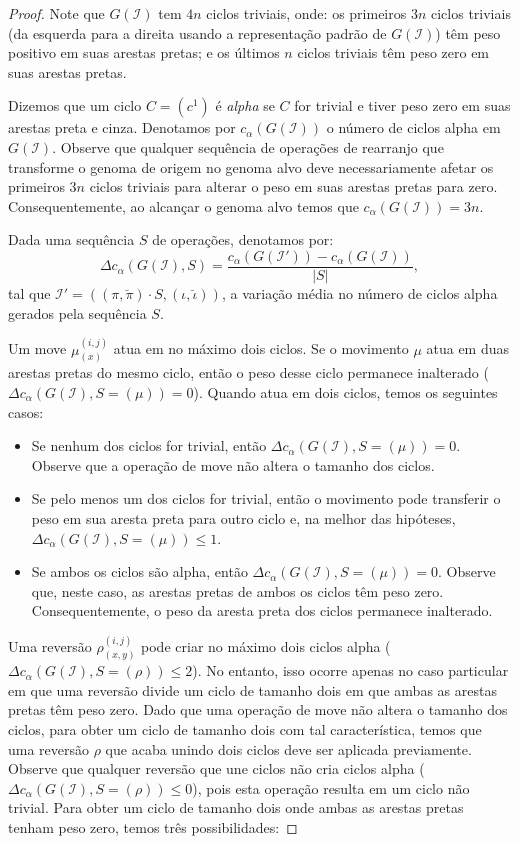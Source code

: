 \begin{proof}
Note que $G(\mathcal{I})$ tem $4n$ ciclos triviais, onde: os primeiros $3n$ ciclos triviais (da esquerda para a direita usando a representação padrão de $G(\mathcal{I})$) têm peso positivo em suas arestas pretas; e os últimos $n$ ciclos triviais têm peso zero em suas arestas pretas.

Dizemos que um ciclo $C=(c^1)$ é \emph{alpha} se $C$ for trivial e tiver peso zero em suas arestas preta e cinza. Denotamos por $c_{\alpha}(G(\mathcal{I}))$ o número de ciclos alpha em $G(\mathcal{I})$. Observe que qualquer sequência de operações de rearranjo que transforme o genoma de origem no genoma alvo deve necessariamente afetar os primeiros $3n$ ciclos triviais para alterar o peso em suas arestas pretas para zero. Consequentemente, ao alcançar o genoma alvo temos que $c_{\alpha}(G(\mathcal{I})) = 3n$.

Dada uma sequência $S$ de operações, denotamos por: $$\Delta c_{\alpha}(G(\mathcal{I}), S) = \frac{c_{\alpha}(G(\mathcal{I'})) - c_{\alpha}(G(\mathcal{I}))}{|S|},$$ tal que $\mathcal{I'} = ((\pi,\breve\pi) \cdot S,(\iota,\breve\iota))$, a variação média no número de ciclos alpha gerados pela sequência $S$.

Um move $\mu_{(x)}^{(i,j)}$ atua em no máximo dois ciclos. Se o movimento $\mu$ atua em duas arestas pretas do mesmo ciclo, então o peso desse ciclo permanece inalterado ($\Delta c_{\alpha}(G(\mathcal{I}), S=(\mu)) = 0$). Quando atua em dois ciclos, temos os seguintes casos:
\begin{itemize}
  \item Se nenhum dos ciclos for trivial, então $\Delta c_{\alpha}(G(\mathcal{I}), S=(\mu)) = 0$. Observe que a operação de move não altera o tamanho dos ciclos.
  \item Se pelo menos um dos ciclos for trivial, então o movimento pode transferir o peso em sua aresta preta para outro ciclo e, na melhor das hipóteses, $\Delta c_{\alpha}(G(\mathcal{I}), S=(\mu)) \le 1$.
  \item Se ambos os ciclos são alpha, então $\Delta c_{\alpha}(G(\mathcal{I}), S=(\mu)) = 0$. Observe que, neste caso, as arestas pretas de ambos os ciclos têm peso zero. Consequentemente, o peso da aresta preta dos ciclos permanece inalterado.
\end{itemize}

Uma reversão $\rho_{(x,y)}^{(i,j)}$ pode criar no máximo dois ciclos alpha ($\Delta c_{\alpha}(G(\mathcal{I}), S=(\rho)) \le 2$). No entanto, isso ocorre apenas no caso particular em que uma reversão divide um ciclo de tamanho dois em que ambas as arestas pretas têm peso zero. Dado que uma operação de move não altera o tamanho dos ciclos, para obter um ciclo de tamanho dois com tal característica, temos que uma reversão $\rho$ que acaba unindo dois ciclos deve ser aplicada previamente. Observe que qualquer reversão que une ciclos não cria ciclos alpha ($\Delta c_{\alpha}(G(\mathcal{I}), S=(\rho)) \le 0$), pois esta operação resulta em um ciclo não trivial. Para obter um ciclo de tamanho dois onde ambas as arestas pretas tenham peso zero, temos três possibilidades:


\end{proof}

